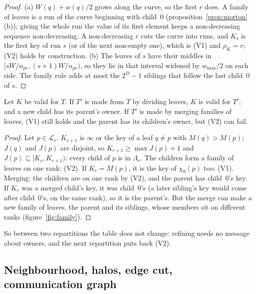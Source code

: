 \begin{proof}
  (a) $W(q) + w(q)/2$ grows along the curve, so the first $r$ does. A
  family of leaves is a run of the curve beginning with child~0
  (proposition~\ref{prop:morton}(b)); giving the whole run the value of
  its first element keeps a non-decreasing sequence non-decreasing. A
  non-decreasing $r$ cuts the curve into runs, and $K_s$ is the first key
  of run $s$ (or of the next non-empty one), which is (V1) and $\rho_K =
  r$; (V2) holds by construction. (b) The leaves of $s$ have their middles
  in $[sW/n_{pe}, (s+1)W/n_{pe})$, so they lie in that interval widened by
  $w_{\max}/2$ on each side. The family rule adds at most the $2^D - 1$
  siblings that follow the last child~0 of $s$.
\end{proof}

\begin{proposition}
  \label{prop:adapt}
  Let $K$ be valid for $T$. If $T'$ is made from $T$ by dividing leaves,
  $K$ is valid for $T'$, and a new child has its parent's owner. If $T'$
  is made by merging families of leaves, (V1) still holds and the parent
  has its children's owner, but (V2) can fail.
\end{proposition}

\begin{proof}
  Let $p \in \mathcal{L}_r$. $K_{r+1}$ is $\infty$ or the key of a leaf $q
  \ne p$ with $M(q) > M(p)$; $J(q)$ and $J(p)$ are disjoint, so $K_{r+1} \ge
  \max J(p) + 1$ and $J(p) \subseteq [K_r, K_{r+1})$: every child of $p$ is
  in $\Lambda_r$. The children form a family of leaves on one rank: (V2).
  If $K_r = M(p)$, it is the key of $\chi_0(p)$ too: (V1). Merging: the
  children are on one rank by (V2), and the parent has child~0's key. If
  $K_r$ was a merged child's key, it was child~0's (a later sibling's key
  would come after child~0's, on the same rank), so it is the parent's.
  But the merge can make a new family of leaves, the parent and its
  siblings, whose members sit on different ranks (figure~\ref{fig:family}).
\end{proof}

So between two repartitions the table does not change: refining needs no
message about owners, and the next repartition puts back (V2).

\subsection{Neighbourhood, halos, edge cut, communication graph}

